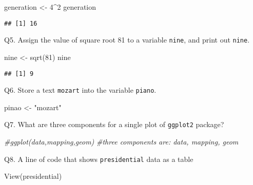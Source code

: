 \documentclass[
]{article}
\newenvironment{Shaded}{\begin{snugshade}}{\end{snugshade}}
\newcommand{\CommentTok}[1]{\textcolor[rgb]{0.56,0.35,0.01}{\textit{#1}}}
\newcommand{\DecValTok}[1]{\textcolor[rgb]{0.00,0.00,0.81}{#1}}
\newcommand{\FunctionTok}[1]{\textcolor[rgb]{0.00,0.00,0.00}{#1}}
\newcommand{\NormalTok}[1]{#1}
\newcommand{\OtherTok}[1]{\textcolor[rgb]{0.56,0.35,0.01}{#1}}
\newcommand{\SpecialCharTok}[1]{\textcolor[rgb]{0.00,0.00,0.00}{#1}}
\newcommand{\StringTok}[1]{\textcolor[rgb]{0.31,0.60,0.02}{#1}}
\begin{document}
\begin{Shaded}
\begin{Highlighting}[]
\NormalTok{generation }\OtherTok{\textless{}{-}} \DecValTok{4}\SpecialCharTok{\^{}}\DecValTok{2}
\NormalTok{generation}
\end{Highlighting}
\end{Shaded}

\begin{verbatim}
## [1] 16
\end{verbatim}

Q5. Assign the value of square root 81 to a variable \texttt{nine}, and
print out \texttt{nine}.

\begin{Shaded}
\begin{Highlighting}[]
\NormalTok{nine }\OtherTok{\textless{}{-}} \FunctionTok{sqrt}\NormalTok{(}\DecValTok{81}\NormalTok{)}
\NormalTok{nine}
\end{Highlighting}
\end{Shaded}

\begin{verbatim}
## [1] 9
\end{verbatim}

Q6. Store a text \texttt{mozart} into the variable \texttt{piano}.

\begin{Shaded}
\begin{Highlighting}[]
\NormalTok{pinao }\OtherTok{\textless{}{-}} \StringTok{"mozart"}
\end{Highlighting}
\end{Shaded}

Q7. What are three components for a single plot of \texttt{ggplot2}
package?

\begin{Shaded}
\begin{Highlighting}[]
\CommentTok{\#ggplot(data,mapping,geom)}
\CommentTok{\#three components are: data, mapping, geom}
\end{Highlighting}
\end{Shaded}

Q8. A line of code that shows \texttt{presidential} data as a table

\begin{Shaded}
\begin{Highlighting}[]
\FunctionTok{View}\NormalTok{(presidential)}
\end{Highlighting}
\end{Shaded}
\end{document}
